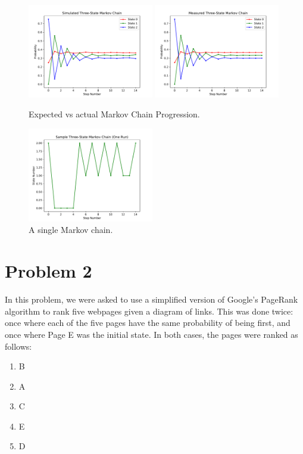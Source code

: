 \documentclass{article}
\begin{document}
\begin{figure}[H]
    \centering
    \includegraphics[width=0.49\textwidth]{Images/Problem1Figure2}
    \includegraphics[width=0.49\textwidth]{Images/Problem1Figure3}
    \caption{Expected vs actual Markov Chain Progression.}
    \label{plot:expected vs actual}
\end{figure}
\begin{figure}[H]
    \centering
    \includegraphics[width=0.49\textwidth]{Images/Problem1Figure1}
    \caption{A single Markov chain.}
    \label{plot:single run}
\end{figure}

\section{Problem 2}
In this problem, we were asked to use a simplified version
of Google's PageRank algorithm to rank five webpages given a
diagram of links. This was done twice: once where each of the
five pages have the same probability of being first, and
once where Page E was the initial state. In both cases,
the pages were ranked as follows:
\begin{enumerate}
    \item B
    \item A
    \item C
    \item E
    \item D
\end{enumerate}
\end{document}
